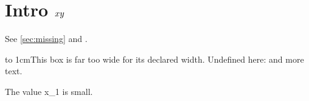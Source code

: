 \documentclass{article}
\begin{document}
\section{Intro $x\\y$}\label{sec:intro}
See \ref{sec:missing} and \cite{ghost}.

\hbox to 1cm{This box is far too wide for its declared width.}
Undefined here: \notacommand{} and more text.

The value x_1 is small.

\end{document}
